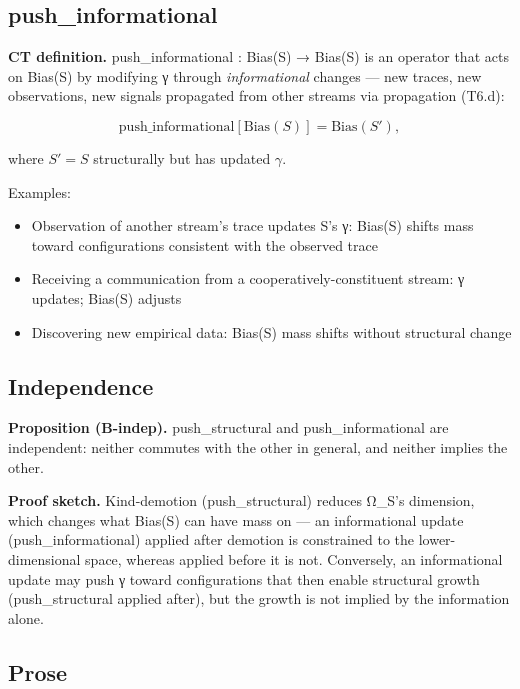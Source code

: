 \documentclass[11pt, openany]{book}
\begin{document}
\subsection{push\_\allowbreak{}informational}

\textbf{CT definition.} push\_\allowbreak{}informational : Bias(S) → Bias(S) is an operator that acts on Bias(S) by modifying γ through \textit{informational} changes --- new traces, new observations, new signals propagated from other streams via propagation (T6.d):

$$\text{push\_informational}[\text{Bias}(S)] = \text{Bias}(S'),$$

where $S' = S$ structurally but has updated $\gamma$.

Examples:
\begin{itemize}
\item Observation of another stream's trace updates S's γ: Bias(S) shifts mass toward configurations consistent with the observed trace
\item Receiving a communication from a cooperatively-constituent stream: γ updates; Bias(S) adjusts
\item Discovering new empirical data: Bias(S) mass shifts without structural change
\end{itemize}

\subsection{Independence}

\textbf{Proposition (B-indep).} push\_\allowbreak{}structural and push\_\allowbreak{}informational are independent: neither commutes with the other in general, and neither implies the other.

\textbf{Proof sketch.} Kind-demotion (push\_\allowbreak{}structural) reduces Ω\_\allowbreak{}S's dimension, which changes what Bias(S) can have mass on --- an informational update (push\_\allowbreak{}informational) applied after demotion is constrained to the lower-dimensional space, whereas applied before it is not. Conversely, an informational update may push γ toward configurations that then enable structural growth (push\_\allowbreak{}structural applied after), but the growth is not implied by the information alone.

\subsection{Prose}
\end{document}
